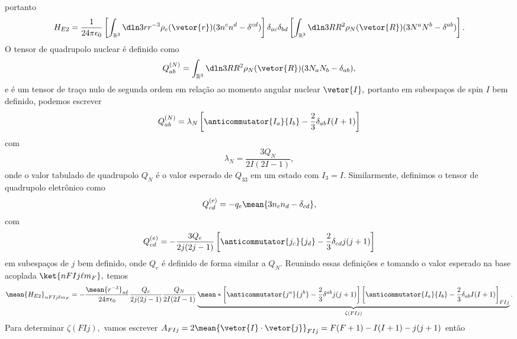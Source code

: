 portanto
\begin{equation*}
   H_{E2} = \frac{1}{24 \pi \epsilon_0} \left[\int_{\mathbb{R}^3} \dln3r r^{-3}\rho_e(\vetor{r}) (3n^c n^d - \delta^{cd})\right] \delta_{ac} \delta_{bd} \left[\int_{\mathbb{R}^3} \dln3R R^2 \rho_N(\vetor{R}) (3 N^a N^b - \delta^{ab})\right].
\end{equation*}
O tensor de quadrupolo nuclear é definido como
\begin{equation*}
   Q^{(N)}_{ab} = \int_{\mathbb{R}^3} \dln3R R^2\rho_N(\vetor{R}) (3N_a N_b - \delta_{ab}),
\end{equation*}
e é um tensor de traço nulo de segunda ordem em relação ao momento angular nuclear \(\vetor{I},\) portanto em subespaços de spin \(I\) bem definido, podemos escrever
\begin{equation*}
   Q_{ab}^{(N)} = \lambda_N\left[\anticommutator{I_a}{I_b} - \frac23 \delta_{ab} I(I+1)\right]
\end{equation*}
com 
\begin{equation*}
   \lambda_N = \frac{3 Q_N}{2I(2I - 1)},
\end{equation*}
onde o valor tabulado de quadrupolo \(Q_N\) é o valor esperado de \(Q_{33}\) em um estado com \(I_3 = I.\) Similarmente, definimos o tensor de quadrupolo eletrônico como 
\begin{equation*}
   Q_{cd}^{(e)} = -q_e\mean{3n_c n_d - \delta_{cd}},
\end{equation*}
com 
\begin{equation*}
   Q^{(e)}_{cd} = - \frac{3Q_e}{2j(2j - 1)}\left[\anticommutator{j_c}{j_d} - \frac23 \delta_{cd} j(j+1)\right]
\end{equation*}
em subespaços de \(j\) bem definido, onde \(Q_e\) é definido de forma similar a \(Q_N.\) Reunindo essas definições e tomando o valor esperado na base acoplada \(\ket{n FI j \ell m_F},\) temos
\begin{equation*}
   \mean{H_{E2}}_{nFIj\ell m_F} = -\frac{\mean{r^{-3}}_{n\ell}}{24\pi \epsilon_0}\frac{Q_e}{2j(2j - 1)} \frac{Q_N}{2I(2I - 1)} \underbrace{\mean*{\left[\anticommutator{j^a}{j^b} - \frac23 \delta^{ab} j(j+1)\right]\left[\anticommutator{I_a}{I_b} - \frac23 \delta_{ab} I(I+1)\right]}_{FIj}}_{\zeta(FIj)}.
\end{equation*}
Para determinar \(\zeta(FIj),\) vamos escrever \(A_{FIj} = 2 \mean{\vetor{I}\cdot \vetor{j}}_{FIj} = F(F+1) - I(I+1) - j(j+1)\) então
